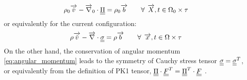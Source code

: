 \begin{equation}
  \label{eq:Lagrangian_linear_momentum}
  \rho_0 {\overrightarrow{\dot{v}}} - {\overrightarrow{\nabla}}_0 \cdot {\underline{\underline{\Pi}}} = \rho_0 {\overrightarrow{b}} \qquad \forall \: \: {\overrightarrow{X}},t \in \Omega_0 \times \tau 
\end{equation}
or equivalently for the current configuration:
\begin{equation}
  \label{eq:HPP_linear_momentum}
  \rho {\overrightarrow{\dot{v}}} - {\overrightarrow{\nabla}} \cdot {\underline{\underline{\sigma}}} = \rho {\overrightarrow{b}}  \qquad \forall \: \: {\overrightarrow{x}},t \in \Omega \times \tau 
\end{equation}
On the other hand, the conservation of angular momentum \eqref{eq:angular_momentum} leads to the symmetry of Cauchy stress tensor ${\underline{\underline{\sigma}}}={\underline{\underline{\sigma}}}^T$, or equivalently from the definition of PK1 tensor, ${\underline{\underline{\Pi}}}\cdot {\underline{\underline{F}}}^T={\underline{\underline{\Pi}}}^T\cdot {\underline{\underline{F}}}$ \cite{Foundation_of_elasticity}.

